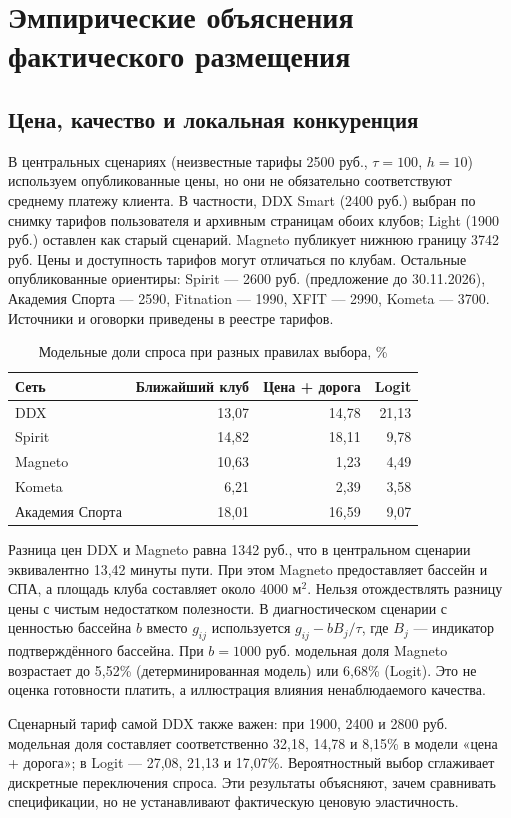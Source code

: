 \documentclass[12pt,a4paper]{article}
\begin{document}
\section{Эмпирические объяснения фактического размещения}
\subsection{Цена, качество и локальная конкуренция}
В центральных сценариях (неизвестные тарифы 2500 руб., $\tau=100$, $h=10$) используем опубликованные цены, но они не обязательно соответствуют среднему платежу клиента. В частности, DDX Smart (2400 руб.) выбран по снимку тарифов пользователя и архивным страницам обоих клубов; Light (1900 руб.) оставлен как старый сценарий. Magneto публикует нижнюю границу 3742 руб. Цены и доступность тарифов могут отличаться по клубам. Остальные опубликованные ориентиры: Spirit --- 2600 руб. (предложение до 30.11.2026), Академия Спорта --- 2590, Fitnation --- 1990, XFIT --- 2990, Kometa --- 3700. Источники и оговорки приведены в реестре тарифов.
\begin{table}[H]\centering\caption{Модельные доли спроса при разных правилах выбора, \%}\small\begin{tabularx}{\linewidth}{Yrrr}\toprule Сеть & Ближайший клуб & Цена + дорога & Logit\\\midrule DDX & 13,07 & 14,78 & 21,13\\ Spirit & 14,82 & 18,11 & 9,78\\ Magneto & 10,63 & 1,23 & 4,49\\ Kometa & 6,21 & 2,39 & 3,58\\ Академия Спорта & 18,01 & 16,59 & 9,07\\\bottomrule\end{tabularx}\end{table}
Разница цен DDX и Magneto равна 1342 руб., что в центральном сценарии эквивалентно 13,42 минуты пути. При этом Magneto предоставляет бассейн и СПА, а площадь клуба составляет около 4000 м$^2$. Нельзя отождествлять разницу цены с чистым недостатком полезности. В диагностическом сценарии с ценностью бассейна $b$ вместо $g_{ij}$ используется $g_{ij}-b B_j/\tau$, где $B_j$ --- индикатор подтверждённого бассейна. При $b=1000$ руб. модельная доля Magneto возрастает до 5,52\% (детерминированная модель) или 6,68\% (Logit). Это не оценка готовности платить, а иллюстрация влияния ненаблюдаемого качества.

Сценарный тариф самой DDX также важен: при 1900, 2400 и 2800 руб. модельная доля составляет соответственно 32,18, 14,78 и 8,15\% в модели «цена + дорога»; в Logit --- 27,08, 21,13 и 17,07\%. Вероятностный выбор сглаживает дискретные переключения спроса. Эти результаты объясняют, зачем сравнивать спецификации, но не устанавливают фактическую ценовую эластичность.
\end{document}
